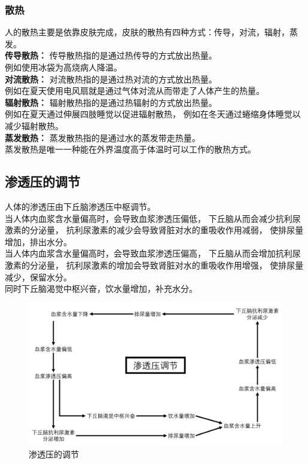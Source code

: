 \documentclass[UTF8]{ctexart}
\begin{document}
\subsubsection{散热}
    人的散热主要是依靠皮肤完成，皮肤的散热有四种方式：传导，对流，辐射，蒸发。\\[6mm]
    \textbf{传导散热：}
    传导散热指的是通过热传导的方式放出热量。\\[3mm]
    例如使用冰袋为高烧病人降温。\\[6mm]
    \textbf{对流散热：}
    对流散热指的是通过热对流的方式放出热量。\\[3mm]
    例如在夏天使用电风扇就是通过气体对流从而带走了人体产生的热量。\\[6mm]
    \textbf{辐射散热：}
    辐射散热指的是通过热辐射的方式放出热量。\\[3mm]
    例如在夏天通过伸展四肢睡觉以促进辐射散热，
    例如在冬天通过蜷缩身体睡觉以减少辐射散热。\\[6mm]
    \textbf{蒸发散热：}
    蒸发散热指的是通过水的蒸发带走热量。\\[3mm]
    蒸发散热是唯一一种能在外界温度高于体温时可以工作的散热方式。\\[4mm]

\newpage
    
\subsection{渗透压的调节}
    人体的渗透压由下丘脑渗透压中枢调节。\\[3mm]
    当人体内血浆含水量偏高时，会导致血浆渗透压偏低，
    下丘脑从而会减少抗利尿激素的分泌量，
    抗利尿激素的减少会导致肾脏对水的重吸收作用减弱，
    使排尿量增加，排出水分。\\[3mm]
    当人体内血浆含水量偏高时，会导致血浆渗透压偏高，
    下丘脑从而会增加抗利尿激素的分泌量，
    抗利尿激素的增加会导致肾脏对水的重吸收作用增强，
    使排尿量减少，保留水分。\\[3mm]
    同时下丘脑渴觉中枢兴奋，饮水量增加，补充水分。
    \begin{figure}[h]
        \begin{center}
            \includegraphics[width=14cm]{BiologyImage/53.jpg}
        \end{center}
        \caption{渗透压的调节}
    \end{figure}
\end{document}
